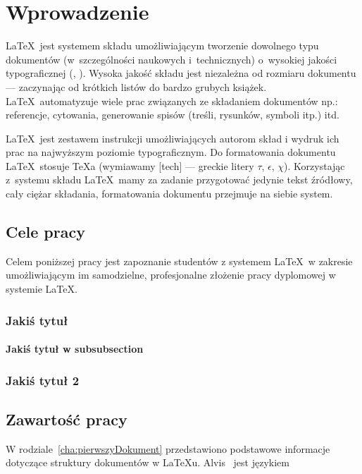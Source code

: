 \chapter{Wprowadzenie}\label{cha:wprowadzenie}

\LaTeX~jest systemem składu umożliwiającym tworzenie dowolnego typu dokumentów (w~szczególności naukowych i~technicznych) o~wysokiej jakości typograficznej (\cite{Dil00}, \cite{Lam92}). Wysoka jakość składu jest niezależna od rozmiaru dokumentu --- zaczynając od krótkich listów do bardzo grubych książek. \LaTeX~automatyzuje wiele prac związanych ze składaniem dokumentów np.: referencje, cytowania, generowanie spisów (treśli, rysunków, symboli itp.) itd.

\LaTeX~jest zestawem instrukcji umożliwiających autorom skład i wydruk ich prac na najwyższym poziomie typograficznym. Do formatowania dokumentu \LaTeX~stosuje \TeX{}a (wymiawamy [tech] --- greckie litery $\tau$, $\epsilon$, $\chi$). Korzystając z~systemu składu \LaTeX~mamy za zadanie przygotować jedynie tekst źródłowy, cały ciężar składania, formatowania dokumentu przejmuje na siebie system.


\section{Cele pracy}\label{sec:celePracy}


Celem poniższej pracy jest zapoznanie studentów z systemem \LaTeX~w zakresie umożliwiającym im samodzielne, profesjonalne złożenie pracy dyplomowej w systemie \LaTeX.

\subsection{Jakiś tytuł}

\subsubsection{Jakiś tytuł w subsubsection}


\subsection{Jakiś tytuł 2}


\section{Zawartość pracy}\label{sec:zawartoscPracy}

W rodziale~\ref{cha:pierwszyDokument} przedstawiono podstawowe informacje dotyczące struktury dokumentów w \LaTeX{}u. Alvis~\cite{Alvis2011} jest językiem 


















